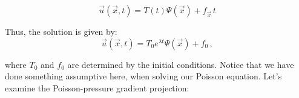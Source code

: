 \documentclass[12pt]{article}
\begin{document}
\[
\vec{u}(\vec{x}, t) = T(t) \Psi(\vec{x}) + f_{\vec x} \, t
\]

Thus, the solution is given by:
\[
\vec{u}(\vec{x}, t) = T_0 e^{\lambda t} \Psi(\vec{x}) + f_{0} \, ,
\]

where \(T_0\) and \(f_0\) are determined by the initial conditions. Notice that we have done something assumptive here, when solving our Poisson equation. Let's examine the Poisson-pressure gradient projection: \\ 


\end{document}
